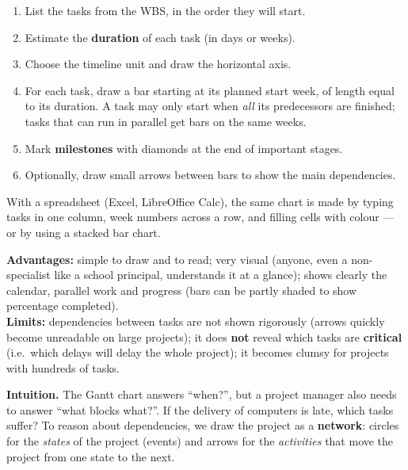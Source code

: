 \documentclass[11pt]{article}
\newcounter{popsec}
\newcounter{popsub}
\newcommand{\courssub}[1]{%
  \stepcounter{popsub}%
  \par\vspace{9pt}\noindent{\popxbold\fontsize{11.5}{13}\selectfont\color{popink}{\color{poporange}\thepopsec.\thepopsub}\hspace{6pt}#1}\par\nopagebreak\vspace{4pt}
}
\begin{document}
\begin{methode}
\begin{enumerate}
\item List the tasks from the WBS, in the order they will start.
\item Estimate the \textbf{duration} of each task (in days or weeks).
\item Choose the timeline unit and draw the horizontal axis.
\item For each task, draw a bar starting at its planned start week, of length equal to its duration. A task may only start when \emph{all} its predecessors are finished; tasks that can run in parallel get bars on the same weeks.
\item Mark \textbf{milestones} with diamonds at the end of important stages.
\item Optionally, draw small arrows between bars to show the main dependencies.
\end{enumerate}
With a spreadsheet (Excel, LibreOffice Calc), the same chart is made by typing tasks in one column, week numbers across a row, and filling cells with colour --- or by using a stacked bar chart.
\end{methode}

\begin{propriete}
\textbf{Advantages:} simple to draw and to read; very visual (anyone, even a non-specialist like a school principal, understands it at a glance); shows clearly the calendar, parallel work and progress (bars can be partly shaded to show percentage completed).\\
\textbf{Limits:} dependencies between tasks are not shown rigorously (arrows quickly become unreadable on large projects); it does \textbf{not} reveal which tasks are \textbf{critical} (i.e.\ which delays will delay the whole project); it becomes clumsy for projects with hundreds of tasks.
\end{propriete}

\courssub{The PERT Chart}

\textbf{Intuition.} The Gantt chart answers ``when?'', but a project manager also needs to answer ``what blocks what?''. If the delivery of computers is late, which tasks suffer? To reason about dependencies, we draw the project as a \textbf{network}: circles for the \emph{states} of the project (events) and arrows for the \emph{activities} that move the project from one state to the next.
\end{document}
